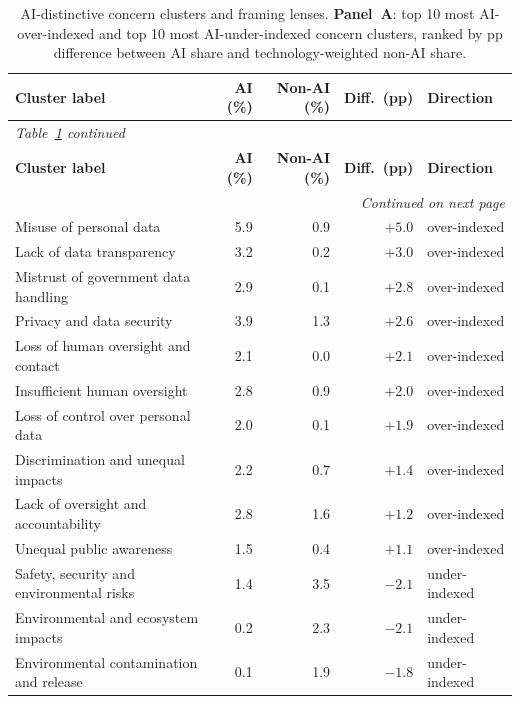 \documentclass[11pt, a4paper]{article}
\begin{document}
\begin{longtable}{@{}lrrrp{3cm}@{}}
\caption{AI-distinctive concern clusters and framing lenses.
\textbf{Panel~A}: top 10 most AI-over-indexed and top 10 most
AI-under-indexed concern clusters, ranked by pp difference between AI
share and technology-weighted non-AI share.}
\label{tab:ai-clusters}\\
\toprule
\textbf{Cluster label} & \textbf{AI (\%)} & \textbf{Non-AI (\%)} &
\textbf{Diff.\ (pp)} & \textbf{Direction} \\
\midrule
\endfirsthead
\multicolumn{5}{l}{\small\textit{Table~\ref{tab:ai-clusters} continued}}\\
\toprule
\textbf{Cluster label} & \textbf{AI (\%)} & \textbf{Non-AI (\%)} &
\textbf{Diff.\ (pp)} & \textbf{Direction} \\
\midrule
\endhead
\midrule
\multicolumn{5}{r}{\small\textit{Continued on next page}}\\
\endfoot
\bottomrule
\endlastfoot
Misuse of personal data                        & 5.9 & 0.9 & $+5.0$ & over-indexed \\
Lack of data transparency                      & 3.2 & 0.2 & $+3.0$ & over-indexed \\
Mistrust of government data handling           & 2.9 & 0.1 & $+2.8$ & over-indexed \\
Privacy and data security                      & 3.9 & 1.3 & $+2.6$ & over-indexed \\
Loss of human oversight and contact            & 2.1 & 0.0 & $+2.1$ & over-indexed \\
Insufficient human oversight                   & 2.8 & 0.9 & $+2.0$ & over-indexed \\
Loss of control over personal data             & 2.0 & 0.1 & $+1.9$ & over-indexed \\
Discrimination and unequal impacts             & 2.2 & 0.7 & $+1.4$ & over-indexed \\
Lack of oversight and accountability           & 2.8 & 1.6 & $+1.2$ & over-indexed \\
Unequal public awareness                       & 1.5 & 0.4 & $+1.1$ & over-indexed \\
\midrule
Safety, security and environmental risks       & 1.4 & 3.5 & $-2.1$ & under-indexed \\
Environmental and ecosystem impacts            & 0.2 & 2.3 & $-2.1$ & under-indexed \\
Environmental contamination and release        & 0.1 & 1.9 & $-1.8$ & under-indexed \\

\end{longtable}
\end{document}
